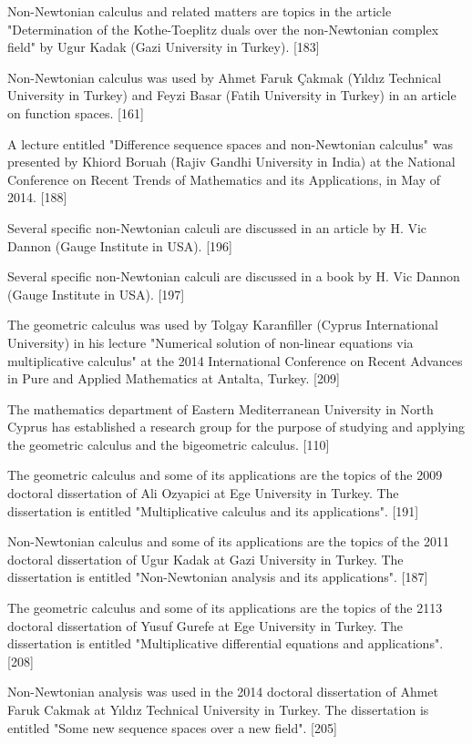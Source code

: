 \documentclass[12pt]{article}
\begin{document}
Non-Newtonian calculus and related matters are topics in the article "Determination of the Kothe-Toeplitz duals over the non-Newtonian complex field" by Ugur Kadak (Gazi University in Turkey). [183]

Non-Newtonian calculus was used by Ahmet Faruk Çakmak (Yıldız Technical University in Turkey) and Feyzi Basar (Fatih University in Turkey) in an article on function spaces. [161]

A lecture entitled "Difference sequence spaces and non-Newtonian calculus" was presented by Khiord Boruah (Rajiv Gandhi University in India) at the National Conference on Recent Trends of Mathematics and its Applications, in May of 2014. [188]

Several specific non-Newtonian calculi are discussed in an article by H. Vic Dannon (Gauge Institute in USA). [196]

Several specific non-Newtonian calculi are discussed in a book by H. Vic Dannon (Gauge Institute in USA). [197]

The geometric calculus was used by Tolgay Karanfiller (Cyprus International University) in his lecture "Numerical solution of non-linear equations via multiplicative calculus" at the 2014 International Conference on Recent Advances in Pure and Applied Mathematics at Antalta, Turkey. [209]

The mathematics department of Eastern Mediterranean University in North Cyprus has established a research group for the purpose of studying and applying the geometric calculus and the bigeometric calculus. [110]

The geometric calculus and some of its applications are the topics of the 2009 doctoral dissertation of Ali Ozyapici at Ege University in Turkey. The dissertation is entitled "Multiplicative calculus and its applications". [191]  

Non-Newtonian calculus and some of its applications are the topics of the 2011 doctoral dissertation of Ugur Kadak at Gazi University in Turkey. The dissertation is entitled "Non-Newtonian analysis and its applications". [187]

The geometric calculus and some of its applications are the topics of the 2113 doctoral dissertation of Yusuf Gurefe at Ege University in Turkey. The dissertation is entitled "Multiplicative differential equations and applications". [208]

Non-Newtonian analysis was used in the 2014 doctoral dissertation of Ahmet Faruk Cakmak at Yıldız Technical University in Turkey. The dissertation is entitled "Some new sequence spaces over a new field". [205]
\end{document}
